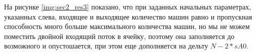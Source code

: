 
На рисунке \ref{img:sec2_res3} показано, что при заданных начальных параметрах, указанных слева, входящее и выходящее количество машин равно и пропускная способность много больше максимального количества машин, но мы не можем поместить двойной входящий поток в ячейку, поэтому она заполняется до возможного и опустошается, при этом еще дополняется на дельту $N - 2 * s A 0$.


\clearpage